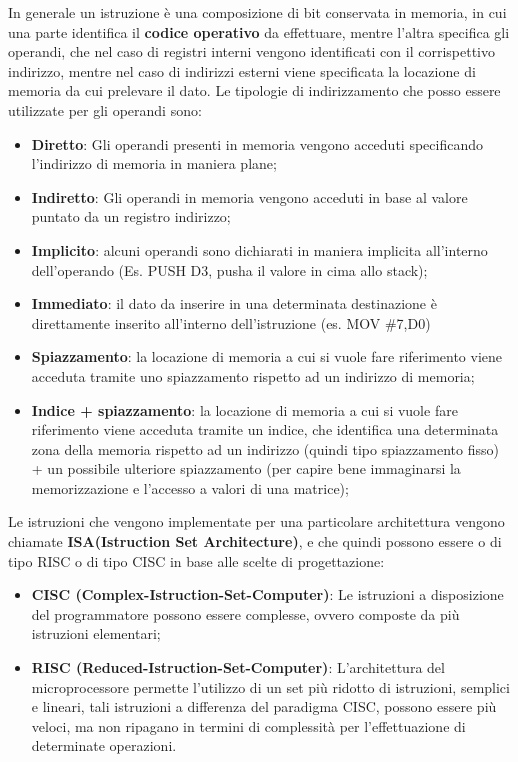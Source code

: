 In generale un istruzione è una composizione di bit conservata in memoria, in cui una parte identifica il \textbf{codice operativo} da effettuare, mentre l'altra specifica gli operandi, che nel caso di registri interni vengono identificati con il corrispettivo indirizzo, mentre nel caso di indirizzi esterni viene specificata la locazione di memoria da cui prelevare il dato. Le tipologie di indirizzamento che posso essere utilizzate per gli operandi sono:
\begin{itemize}
    \item \textbf{Diretto}: Gli operandi presenti in memoria vengono acceduti specificando l'indirizzo di memoria in maniera plane;
    \item \textbf{Indiretto}: Gli operandi in memoria vengono acceduti in base al valore puntato da un registro indirizzo;
    \item \textbf{Implicito}: alcuni operandi sono dichiarati in maniera implicita all'interno dell'operando (Es. PUSH D3, pusha il valore in cima allo stack);
    \item \textbf{Immediato}: il dato da inserire in una determinata destinazione è direttamente inserito all'interno dell'istruzione (es. MOV \#7,D0)
    \item \textbf{Spiazzamento}: la locazione di memoria a cui si vuole fare riferimento viene acceduta tramite uno spiazzamento rispetto ad un indirizzo di memoria;
    \item \textbf{Indice + spiazzamento}: la locazione di memoria a cui si vuole fare riferimento viene acceduta tramite un indice, che identifica una determinata zona della memoria rispetto ad un indirizzo (quindi tipo spiazzamento fisso) + un possibile ulteriore spiazzamento (per capire bene immaginarsi la memorizzazione e l'accesso a valori di una matrice);
\end{itemize}

Le istruzioni che vengono implementate per una particolare architettura vengono chiamate \textbf{ISA(Istruction Set Architecture)}, e che quindi possono essere o di tipo RISC o di tipo CISC in base alle scelte di progettazione:
\begin{itemize}
    \item \textbf{CISC (Complex-Istruction-Set-Computer)}: Le istruzioni a disposizione del programmatore possono essere complesse, ovvero composte da più istruzioni elementari;
    \item \textbf{RISC (Reduced-Istruction-Set-Computer)}: L'architettura del microprocessore permette l'utilizzo di un set più ridotto di istruzioni, semplici e lineari, tali istruzioni a differenza del paradigma CISC, possono essere più veloci, ma non ripagano in termini di complessità per l'effettuazione di determinate operazioni.
\end{itemize}

